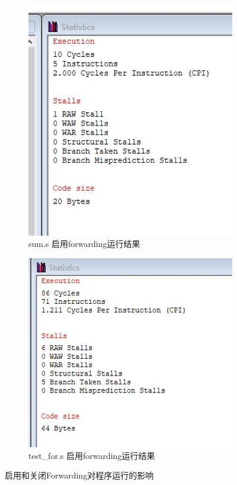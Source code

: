 \documentclass{ctexrep}
\begin{document}
\begin{figure}[htp]
    
    \begin{subfigure}{.4\linewidth}
        \centering
        \includegraphics[width=\linewidth]{sum.s_with_forwarding.jpeg}
        \caption{sum.s 启用forwarding运行结果}
    \end{subfigure}
    \begin{subfigure}{.4\linewidth}
        \centering
        \includegraphics[width=\linewidth]{test_for.s_with_forwarding.jpeg}
        \caption{test_for.s 启用forwarding运行结果}
    \end{subfigure}
    \caption{启用和关闭Forwarding对程序运行的影响}
    \label{fig:forward}
\end{figure}
\end{document}
